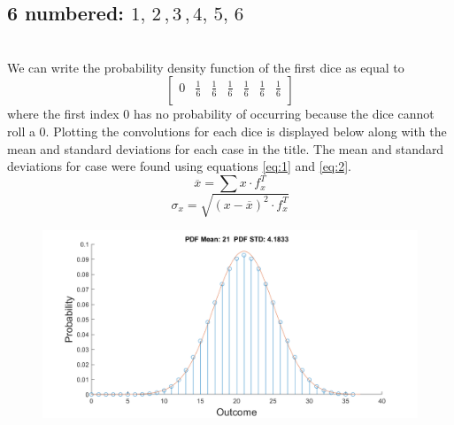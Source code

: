 \documentclass[12pt,letterpaper, onecolumn]{exam}
\begin{document}
\begin{questions}
\begin{parts}
            \part{6 numbered: $1,\,2\,,3\,,4,\,5,\,6$}\\
                \solution
                    We can write the probability density function of the first dice as equal to
                    \[\begin{bmatrix}
                        0 & \frac{1}{6} & \frac{1}{6} & \frac{1}{6} & \frac{1}{6} & \frac{1}{6} & \frac{1}{6}\\
                    \end{bmatrix} \]    
                    where the first index $0$ has no probability of occurring because the dice cannot roll a 0. Plotting the convolutions for each dice is displayed below along with the mean and standard deviations for each case in the title. The mean and standard deviations for case were found using equations \ref{eq:1} and \ref{eq:2}. 
                    \begin{equation}\label{eq:1}
                        \overline{x} = \sum x \cdot f_x^T
                    \end{equation}
                    \begin{equation}\label{eq:2}
                        \sigma_x = \sqrt{(x - \overline{x})^2 \cdot f_x^T}
                    \end{equation}
                    \begin{figure}[!h]
                        \centering
                        \includegraphics[width=.91\linewidth]{Q1_a.png}
                    \end{figure}
\clearpage                    

\end{parts}
\end{questions}
\end{document}
